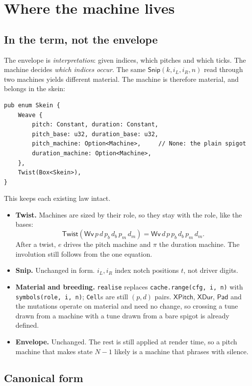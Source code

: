 \documentclass[11pt,a4paper]{article}
\theoremstyle{definition}
\theoremstyle{plain}
\theoremstyle{remark}
\begin{document}
\section{Where the machine lives}

\subsection{In the term, not the envelope}

The envelope is \emph{interpretation}: given indices, which pitches and which ticks. The machine
decides \emph{which indices occur}. The same $\mathsf{Snip}(k,i_L,i_R,n)$ read through two machines
yields different material. The machine is therefore material, and belongs in the skein:

\begin{lstlisting}
pub enum Skein {
    Weave {
        pitch: Constant, duration: Constant,
        pitch_base: u32, duration_base: u32,
        pitch_machine: Option<Machine>,     // None: the plain spigot
        duration_machine: Option<Machine>,
    },
    Twist(Box<Skein>),
}
\end{lstlisting}

This keeps each existing law intact.
\begin{itemize}[leftmargin=*,itemsep=2pt]
\item \textbf{Twist.} Machines are sized by their role, so they stay with the role, like the bases:
  \[\mathsf{Twist}(\mathsf{Wv}\,p\,d\,p_b\,d_b\,p_m\,d_m)=\mathsf{Wv}\,d\,p\,p_b\,d_b\,p_m\,d_m .\]
  After a twist, $e$ drives the pitch machine and $\pi$ the duration machine. The involution still
  follows from the one equation.
\item \textbf{Snip.} Unchanged in form. $i_L,i_R$ index notch positions $t$, not driver digits.
\item \textbf{Material and breeding.} \texttt{realise} replaces \texttt{cache.range(cfg, i, n)} with
  \texttt{symbols(role, i, n)}; \texttt{Cell}s are still $(p,d)$ pairs. $\mathsf{XPitch}$,
  $\mathsf{XDur}$, $\mathsf{Pad}$ and the mutations operate on material and need no change, so
  crossing a tune drawn from a machine with a tune drawn from a bare spigot is already defined.
\item \textbf{Envelope.} Unchanged. The rest is still applied at render time, so a pitch machine
  that makes state $N-1$ likely is a machine that phrases with silence.
\end{itemize}

\subsection{Canonical form}
\end{document}

